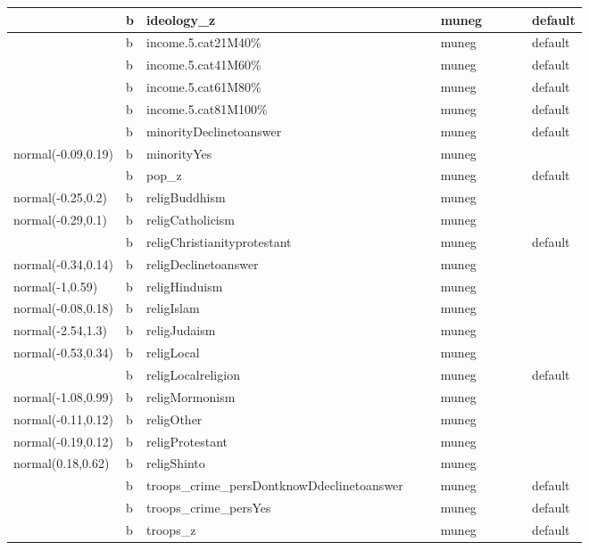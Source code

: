 \documentclass[
]{book}
\theoremstyle{definition}
\theoremstyle{definition}
\theoremstyle{definition}
\theoremstyle{definition}
\theoremstyle{remark}
\begin{document}
\begin{table}
\begin{tabular}[t]{l|l|l|l|l|l|l|l|l|l}
\hline
 & b & ideology\_z &  &  & muneg &  &  &  & default\\
\hline
 & b & income.5.cat21M40\% &  &  & muneg &  &  &  & default\\
\hline
 & b & income.5.cat41M60\% &  &  & muneg &  &  &  & default\\
\hline
 & b & income.5.cat61M80\% &  &  & muneg &  &  &  & default\\
\hline
 & b & income.5.cat81M100\% &  &  & muneg &  &  &  & default\\
\hline
 & b & minorityDeclinetoanswer &  &  & muneg &  &  &  & default\\
\hline
normal(-0.09,0.19) & b & minorityYes &  &  & muneg &  &  &  & \\
\hline
 & b & pop\_z &  &  & muneg &  &  &  & default\\
\hline
normal(-0.25,0.2) & b & religBuddhism &  &  & muneg &  &  &  & \\
\hline
normal(-0.29,0.1) & b & religCatholicism &  &  & muneg &  &  &  & \\
\hline
 & b & religChristianityprotestant &  &  & muneg &  &  &  & default\\
\hline
normal(-0.34,0.14) & b & religDeclinetoanswer &  &  & muneg &  &  &  & \\
\hline
normal(-1,0.59) & b & religHinduism &  &  & muneg &  &  &  & \\
\hline
normal(-0.08,0.18) & b & religIslam &  &  & muneg &  &  &  & \\
\hline
normal(-2.54,1.3) & b & religJudaism &  &  & muneg &  &  &  & \\
\hline
normal(-0.53,0.34) & b & religLocal &  &  & muneg &  &  &  & \\
\hline
 & b & religLocalreligion &  &  & muneg &  &  &  & default\\
\hline
normal(-1.08,0.99) & b & religMormonism &  &  & muneg &  &  &  & \\
\hline
normal(-0.11,0.12) & b & religOther &  &  & muneg &  &  &  & \\
\hline
normal(-0.19,0.12) & b & religProtestant &  &  & muneg &  &  &  & \\
\hline
normal(0.18,0.62) & b & religShinto &  &  & muneg &  &  &  & \\
\hline
 & b & troops\_crime\_persDontknowDdeclinetoanswer &  &  & muneg &  &  &  & default\\
\hline
 & b & troops\_crime\_persYes &  &  & muneg &  &  &  & default\\
\hline
 & b & troops\_z &  &  & muneg &  &  &  & default\\

\end{tabular}
\end{table}
\end{document}
